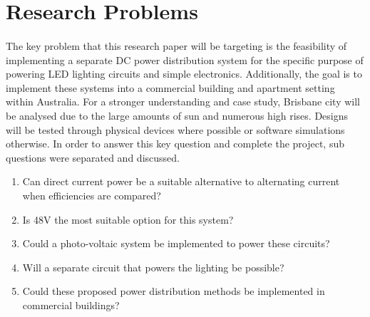 
\section{Research Problems}

\paragraph{}
The key problem that this research paper will be targeting is the feasibility of implementing a separate DC power distribution system for the specific purpose of powering LED lighting circuits and simple electronics. Additionally, the goal is to implement these systems into a commercial building and apartment setting within Australia. For a stronger understanding and case study, Brisbane city will be analysed due to the large amounts of sun and numerous high rises. Designs will be tested through physical devices where possible or software simulations otherwise. In order to answer this key question and complete the project, sub questions were separated and discussed.

\begin{enumerate}
\itemsep-0.5em 
\item Can direct current power be a suitable alternative to alternating current when efficiencies are compared?
\item Is 48V the most suitable option for this system?
\item Could a photo-voltaic system be implemented to power these circuits?
\item Will a separate circuit that powers the lighting be possible?
\item Could these proposed power distribution methods be implemented in commercial buildings?
\end{enumerate} 

\newpage